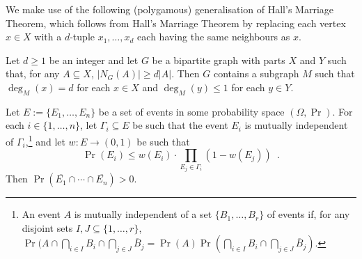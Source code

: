 \documentclass{patmorin}
\begin{document}


We make use of the following (polygamous) generalisation of Hall's Marriage Theorem, which follows from Hall's Marriage Theorem by replacing each vertex $x\in X$ with a $d$-tuple $x_1,\ldots,x_d$ each having the same neighbours as $x$.



\begin{cor}\label{d_hall}
  Let $d\ge 1$ be an integer and let $G$ be a bipartite graph with parts $X$ and $Y$ such that, for any $A\subseteq X$, $|N_G(A)|\ge d|A|$.  Then $G$ contains a subgraph $M$ such that $\deg_M(x)=d$ for each $x\in X$ and $\deg_M(y)\le 1$ for each $y\in Y$.
\end{cor}


\begin{lem}\label{weighted_lovasz}
  Let $E:=\{E_1,\ldots,E_n\}$ be a set of events in some probability space $(\Omega,\Pr)$.  For each $i\in\{1,\ldots,n\}$, let $\Gamma_i\subseteq E$ be such that the event $E_i$ is mutually independent of $\Gamma_i$,\footnote{An event $A$ is mutually independent of a set $\{B_1,\ldots,B_r\}$ of events if, for any disjoint sets $I,J\subseteq\{1,\ldots,r\}$, $\Pr(A\cap\bigcap_{i\in I} B_i\cap\bigcap_{j\in J} \overline{B}_j=\Pr(A)\Pr(\bigcap_{i\in I} B_i\cap\bigcap_{j\in J} \overline{B}_j)$.} and let $w:E\to(0,1)$ be such that
  \[
      \Pr(E_i) \le w(E_i)\cdot\prod_{E_j\in\Gamma_i}(1-w(E_j))  \enspace .
  \]
  Then $\Pr(\overline{E_1}\cap\cdots\cap\overline{E_n}) > 0$.
\end{lem}
\end{document}
